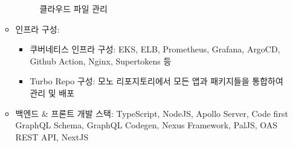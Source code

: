 \begin{itemize}
\begin{itemize}[label=$\star$]
\begin{figure}[!ht]
\begin{fullwidth}
{					            \caption*{클라우드 파일 관리}
				            }
			            \end{fullwidth}
		            \end{figure}
		      \item 인프라 구성:
		            \begin{itemize}
			            \item 쿠버네티스 인프라 구성: EKS, ELB, Prometheus, Grafana, ArgoCD, Github Action, Nginx, Supertokens 등
			            \item Turbo Repo 구성: 모노 리포지토리에서 모든 앱과 패키지들을 통합하여 관리 및 배포
		            \end{itemize}
		      \item 백엔드 \& 프론트 개발 스택: TypeScript, NodeJS, Apollo Server, Code first GraphQL Schema, GraphQL Codegen, Nexus Framework, PalJS, OAS REST API, NextJS
	      \end{itemize}


\end{itemize}
